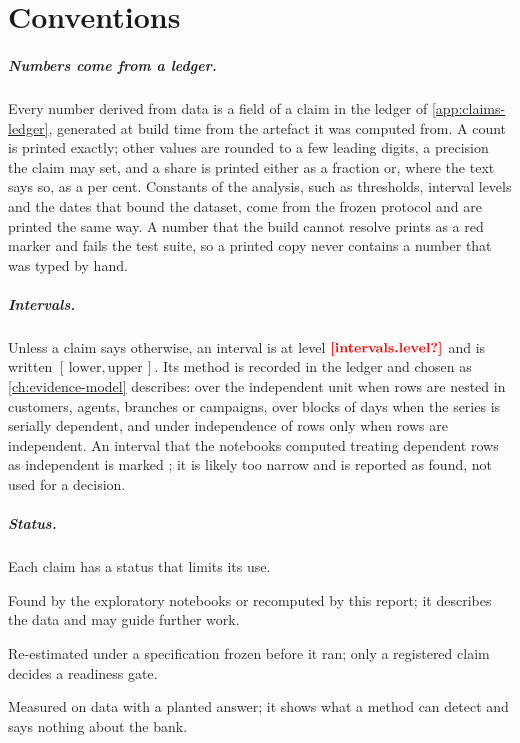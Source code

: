 \chapter*{Conventions}

\paragraph{Numbers come from a ledger.} Every number derived from data is a field of a claim in the ledger of
\cref{app:claims-ledger}, generated at build time from the artefact it was computed from. A count is printed exactly;
other values are rounded to a few leading digits, a precision the claim may set, and a share is printed
either as a fraction or, where the text says so, as a per cent. Constants of the analysis, such as thresholds, interval
levels and the dates that bound the dataset, come from the frozen protocol and are printed the same way. A number that
the build cannot resolve prints as a red marker and fails the test suite, so a printed copy never contains a number
that was typed by hand.

\paragraph{Intervals.} Unless a claim says otherwise, an interval is at level $\proto{intervals.level}$ and is written
$[\,\text{lower}, \text{upper}\,]$. Its method is recorded in the ledger and chosen as \cref{ch:evidence-model}
describes: over the independent unit when rows are nested in customers, agents, branches or campaigns, over blocks of
days when the series is serially dependent, and under independence of rows only when rows are independent. An interval
that the notebooks computed treating dependent rows as independent is marked \naivemark{}; it is likely too narrow and
is reported as found, not used for a decision.

\paragraph{Status.} Each claim has a status that limits its use.
\begin{description}[style=nextline]
  \item[Exploratory] Found by the exploratory notebooks or recomputed by this report; it describes the data and may
  guide further work.
  \item[Registered] Re-estimated under a specification frozen before it ran; only a registered claim decides a
  readiness gate.
  \item[Positive control] Measured on data with a planted answer; it shows what a method can detect and says nothing
  about the bank.
\end{description}


